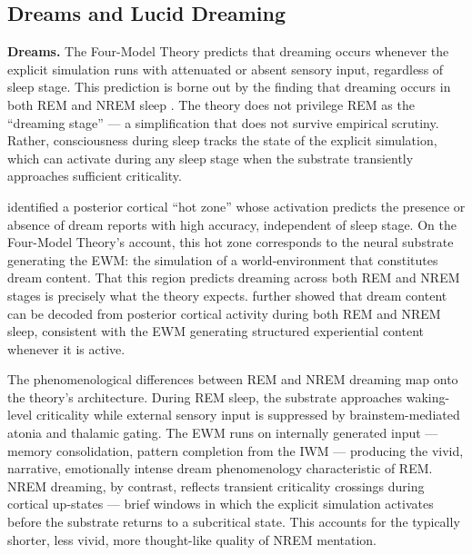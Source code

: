 \documentclass[12pt]{article}
\newcommand{\revstart}{}
\begin{document}
{\revstart\subsection{Dreams and Lucid Dreaming}


\textbf{Dreams.} The Four-Model Theory predicts that dreaming occurs whenever the explicit simulation runs with attenuated or absent sensory input, regardless of sleep stage. This prediction is borne out by the finding that dreaming occurs in both REM and NREM sleep \citep{Noreika2009,Siclari2017,Siclari2021,NirTononi2010}. The theory does not privilege REM as the ``dreaming stage'' --- a simplification that does not survive empirical scrutiny. Rather, consciousness during sleep tracks the state of the explicit simulation, which can activate during any sleep stage when the substrate transiently approaches sufficient criticality.

\citet{Siclari2017} identified a posterior cortical ``hot zone'' whose activation predicts the presence or absence of dream reports with high accuracy, independent of sleep stage. On the Four-Model Theory's account, this hot zone corresponds to the neural substrate generating the EWM: the simulation of a world-environment that constitutes dream content. That this region predicts dreaming across both REM and NREM stages is precisely what the theory expects. \citet{Siclari2021} further showed that dream content can be decoded from posterior cortical activity during both REM and NREM sleep, consistent with the EWM generating structured experiential content whenever it is active.

The phenomenological differences between REM and NREM dreaming map onto the theory's architecture. During REM sleep, the substrate approaches waking-level criticality while external sensory input is suppressed by brainstem-mediated atonia and thalamic gating. The EWM runs on internally generated input --- memory consolidation, pattern completion from the IWM --- producing the vivid, narrative, emotionally intense dream phenomenology characteristic of REM. NREM dreaming, by contrast, reflects transient criticality crossings during cortical up-states \citep{Steriade2001} --- brief windows in which the explicit simulation activates before the substrate returns to a subcritical state. This accounts for the typically shorter, less vivid, more thought-like quality of NREM mentation.

}
\end{document}
